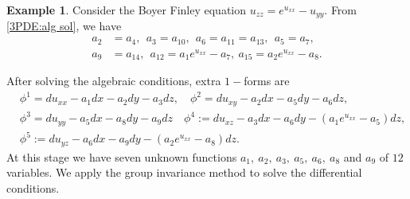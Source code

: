 \documentclass[a4paper, 11pt]{amsart}
\theoremstyle{definition}
\newtheorem{example}[theorem]{Example}
\begin{document}
\begin{example}
Consider the Boyer Finley equation
$u_{zz}=e^{u_{xx}}-u_{yy}.$
From \eqref{3PDE:alg sol}, we have
\begin{align*}
 a_2&=a_4,~~a_3=a_{10},~~a_6=a_{11}=a_{13},~~a_5=a_7,\\
  a_9&=a_{14},~~a_{12}=a_1e^{u_{xx}}-a_7,~ a_{15}=a_2e^{u_{xx}}-a_8.
\end{align*}

After solving the algebraic conditions, extra $1-$forms are
\begin{align*}
  &\phi^1=du_{xx}-a_1dx-a_2dy-a_3dz,\quad \phi^2=du_{xy}-a_2dx-a_5dy-a_6dz,\\
  &\phi^3=du_{yy}-a_5dx-a_8dy-a_9dz\quad \phi^4:=du_{xz}-a_3dx-a_6dy-(a_1e^{u_{xx}}-a_5)dz,\\
  & \phi^5:=du_{yz}-a_6dx-a_9dy-(a_2e^{u_{xx}}-a_8)dz.
\end{align*}
At this stage we have seven unknown functions $a_1,~a_2,~a_3,~a_5,~a_6,~a_8$ and $a_9$ of $12$ variables. We apply the group invariance method to solve the differential conditions.


\end{example}
\end{document}
